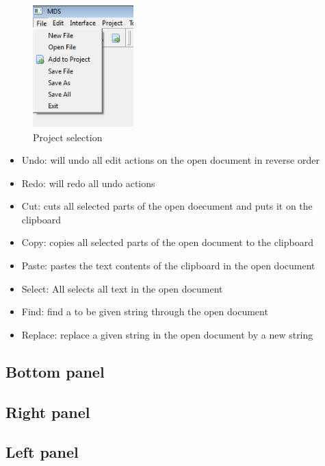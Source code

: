     \begin{figure}
        \centering
        \includegraphics[width=110pt]{img/menu_file.png}
        \caption{Project selection}
    \end{figure}

    \begin{itemize}
        \item Undo: will undo all edit actions on the open document in reverse order
        \item Redo: will redo all undo actions
        \item Cut: cuts all selected parts of the open doecument and puts it on the clipboard
        \item Copy: copies all selected parts of the open document to the clipboard
        \item Paste: pastes the text contents of the clipboard in the open document
        \item Select: All selects all text in the open document
        \item Find: find a to be given string through the open document
        \item Replace: replace a given string in the open document by a new string
    \end{itemize}

\subsection{Bottom panel}

\subsection{Right panel}

\subsection{Left panel}


